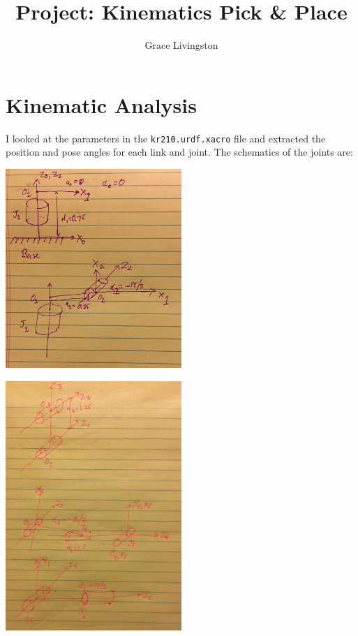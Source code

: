 \documentclass{article}
\title{Project: Kinematics Pick \& Place}
\author{Grace Livingston}
\begin{document}
\maketitle
\tableofcontents

\newpage

\section{Kinematic Analysis}

I looked at the parameters in the \texttt{kr210.urdf.xacro} file and
extracted the position and pose angles for each link and joint.
The schematics of the joints are:

\begin{table}[h]
    \begin{center}
        \includegraphics[width=0.5\textwidth]{misc_images/sch1.jpeg}
    \end{center}
    \caption{$J_1 - J_2$}
\end{table}

\begin{table}[h]
    \begin{center}
        \includegraphics[width=0.5\textwidth]{misc_images/sch2.jpeg}
    \end{center}
    \caption{$J_3 - J_6$}
\end{table}
\end{document}

